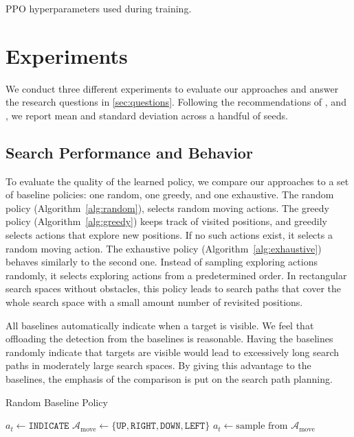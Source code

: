 \begin{table}
    \centering
    \caption[PPO hyperparameters]{PPO hyperparameters used during training.}
    
    \label{tab:hyperparameters}
\end{table}

\section{Experiments}
\label{sec:experiments}

We conduct three different experiments to evaluate our approaches and answer the research questions in \ref{sec:questions}. 
Following the recommendations of \cite{henderson_deep_2018}, \cite{colas_hitchhikers_2019} and \cite{agarwal_deep_2022}, we report mean and standard deviation across a handful of seeds.

\subsection{Search Performance and Behavior}

To evaluate the quality of the learned policy, we compare our approaches to a set of baseline policies: one random, one greedy, and one exhaustive.
The random policy (Algorithm~\ref{alg:random}), selects random moving actions.
The greedy policy (Algorithm~\ref{alg:greedy}) keeps track of visited positions, and greedily selects actions that explore new positions.
If no such actions exist, it selects a random moving action.
The exhaustive policy (Algorithm~\ref{alg:exhaustive}) behaves similarly to the second one.
Instead of sampling exploring actions randomly, it selects exploring actions from a predetermined order.
In rectangular search spaces without obstacles, this policy leads to search paths that cover the whole search space with a small amount number of revisited positions.

All baselines automatically indicate when a target is visible.
We feel that offloading the detection from the baselines is reasonable.
Having the baselines randomly indicate that targets are visible would lead to excessively long search paths in moderately large search spaces.
By giving this advantage to the baselines, the emphasis of the comparison is put on the search path planning.

\begin{algorithm}
    \caption{Random Baseline Policy}
    \label{alg:random}
    \begin{algorithmic}
            \State \(a_t \leftarrow \mathtt{INDICATE}\)
        \Else
            \State \(\mathcal{A}_{\text{move}} \leftarrow \{\mathtt{UP}, \mathtt{RIGHT}, \mathtt{DOWN}, \mathtt{LEFT}\}\)
            \State \(a_t \leftarrow \text{sample from } \mathcal{A}_{\text{move}}\)
        \EndIf
    \end{algorithmic}
\end{algorithm}

